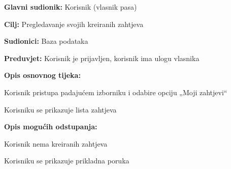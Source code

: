 					\noindent {}
					\begin{packed_item}
						
						\item \textbf{Glavni sudionik: } Korisnik (vlasnik pasa)
						\item  \textbf{Cilj:} Pregledavanje svojih kreiranih zahtjeva
						\item  \textbf{Sudionici:} Baza podataka 
						\item  \textbf{Preduvjet:} Korisnik je prijavljen, korisnik ima ulogu vlasnika
						\item  \textbf{Opis osnovnog tijeka:}
						
						\item[] \begin{packed_enum}
							
							\item Korisnik pristupa padajućem izborniku i odabire opciju „Moji zahtjevi“  
							\item Korisniku se prikazuje lista zahtjeva
							
						\end{packed_enum}
					
						\item  \textbf{Opis mogućih odstupanja:}
						
						\item[] \begin{packed_item}
							
							\item[2.a] Korisnik nema kreiranih zahtjeva
							\item[] \begin{packed_enum}
								
								\item Korisniku se prikazuje prikladna poruka
								
							\end{packed_enum}
						\end{packed_item}
					\end{packed_item}	
				
